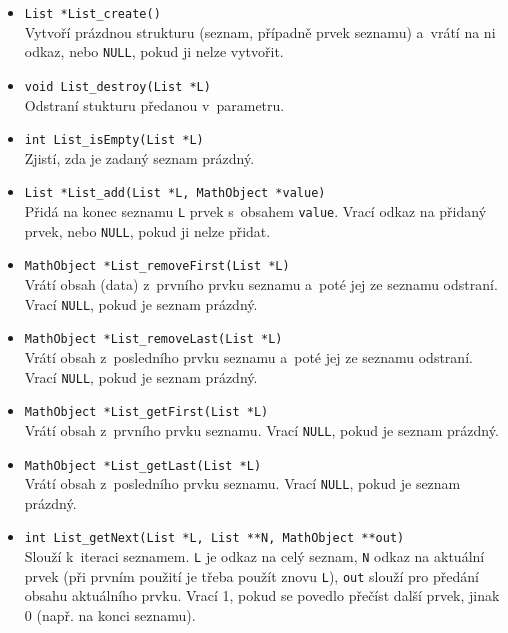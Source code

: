 \documentclass[pdftex,a4paper]{article}
\begin{document}
\begin{itemize}
\item \texttt{List *List\_create()} \\ Vytvoří prázdnou strukturu (seznam, případně prvek seznamu) a~vrátí na ni odkaz, nebo \texttt{NULL}, pokud ji nelze vytvořit.

\item \texttt{void List\_destroy(List *L)} \\ Odstraní stukturu předanou v~parametru.

\item \texttt{int List\_isEmpty(List *L)} \\ Zjistí, zda je zadaný seznam prázdný.

\item \texttt{List *List\_add(List *L, MathObject *value)} \\ Přidá na konec seznamu \texttt{L} prvek s~obsahem \texttt{value}. Vrací odkaz na přidaný prvek, nebo \texttt{NULL}, pokud ji nelze přidat.

\item \texttt{MathObject *List\_removeFirst(List *L)} \\ Vrátí obsah (data) z~prvního prvku seznamu a~poté jej ze seznamu odstraní. Vrací \texttt{NULL}, pokud je seznam prázdný.

\item \texttt{MathObject *List\_removeLast(List *L)} \\ Vrátí obsah z~posledního prvku seznamu a~poté jej ze seznamu odstraní. Vrací \texttt{NULL}, pokud je seznam prázdný.

\item \texttt{MathObject *List\_getFirst(List *L)} \\ Vrátí obsah z~prvního prvku seznamu. Vrací \texttt{NULL}, pokud je seznam prázdný.

\item \texttt{MathObject *List\_getLast(List *L)} \\ Vrátí obsah z~posledního prvku seznamu. Vrací \texttt{NULL}, pokud je seznam prázdný.

\item \texttt{int List\_getNext(List *L, List **N, MathObject **out)} \\ Slouží k~iteraci seznamem. \texttt{L} je odkaz na celý seznam, \texttt{N} odkaz na aktuální prvek (při prvním použití je třeba použít znovu \texttt{L}), \texttt{out} slouží pro předání obsahu aktuálního prvku. Vrací 1, pokud se povedlo přečíst další prvek, jinak 0 (např. na konci seznamu).


\end{itemize}
\end{document}
